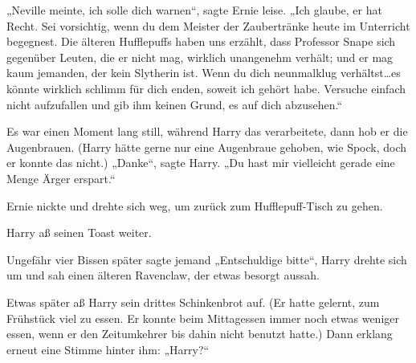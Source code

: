 „Neville meinte, ich solle dich warnen“, sagte Ernie leise. „Ich glaube, er hat Recht. Sei vorsichtig, wenn du dem Meister der Zaubertränke heute im Unterricht begegnest. Die älteren Hufflepuffs haben uns erzählt, dass Professor Snape sich gegenüber Leuten, die er nicht mag, wirklich unangenehm verhält; und er mag kaum jemanden, der kein Slytherin ist. Wenn du dich neunmalklug verhältst…es könnte wirklich schlimm für dich enden, soweit ich gehört habe. Versuche einfach nicht aufzufallen und gib ihm keinen Grund, es auf dich abzusehen.“

Es war einen Moment lang still, während Harry das verarbeitete, dann hob er die Augenbrauen. (Harry hätte gerne nur eine Augenbraue gehoben, wie Spock, doch er konnte das nicht.) „Danke“, sagte Harry. „Du hast mir vielleicht gerade eine Menge Ärger erspart.“

Ernie nickte und drehte sich weg, um zurück zum Hufflepuff-Tisch zu gehen.

Harry aß seinen Toast weiter.

Ungefähr vier Bissen später sagte jemand „Entschuldige bitte“, Harry drehte sich um und sah einen älteren Ravenclaw, der etwas besorgt aussah.

Etwas später aß Harry sein drittes Schinkenbrot auf. (Er hatte gelernt, zum Frühstück viel zu essen. Er konnte beim Mittagessen immer noch etwas weniger essen, wenn er den Zeitumkehrer bis dahin nicht benutzt hatte.) Dann erklang erneut eine Stimme hinter ihm: „Harry?“

